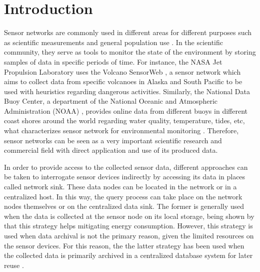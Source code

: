 


\chapter{Introduction}

Sensor networks are commonly used in different areas for different purposes
such as scientific measurements and general population use \cite{sn-intro01}
\cite{sn-intro02}. In the scientific community, they serve as tools to monitor
the state of the environment by storing samples of data in specific periods of
time. For instance, the NASA Jet Propulsion Laboratory uses the Volcano
SensorWeb \cite{sn-ex02}, a sensor network which aims to collect data from
specific volcanoes in Alaska and South Pacific to be used with heuristics
regarding dangerous activities. Similarly, the National Data Buoy Center, a
department of the National Oceanic and Atmospheric Administration (NOAA)
\cite{sn-ex03}, provides online data from different buoys in different coast
shores around the world regarding water quality, temperature, tides, etc, what
characterizes sensor network for environmental monitoring \cite{sn-ex01}.
Therefore, sensor networks can be seen as a very important scientific research
and commercial field with direct application and use of its produced data.

In order to provide access to the collected sensor data, different approaches
can be taken to interrogate sensor devices indirectly by accessing its data in
places called network sink. These data nodes can be located in the network or 
in a centralized host. In this way, the query process can take place on the
network nodes themselves or on the centralized data sink. The former is
generally used when the data is collected at the sensor node on its local
storage, being shown by \cite{sn-storage01} \cite{sn-storage03}
\cite{sn-storage04} that this strategy helps mitigating energy consumption.
However, this strategy is used when data archival is not the primary reason,
given the limited resources on the sensor devices. For this reason, the the
latter strategy has been used when the collected data is primarily archived in
a centralized database system for later reuse \cite{sn-storage02}.

